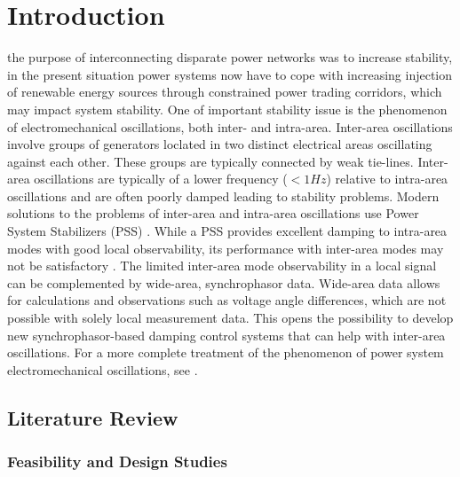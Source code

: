 \documentclass{ieeeaccess}
\begin{document}
\section{Introduction}
\label{sec:introduction}
 the purpose of interconnecting disparate power networks was to increase stability, in the present situation power systems now have to cope with increasing injection of renewable energy sources through constrained power trading corridors, which may impact system stability. One of important stability issue is the phenomenon of electromechanical oscillations\cite{KundurTwoArea}, both inter- and intra-area. Inter-area oscillations involve groups of generators loclated in two distinct electrical areas oscillating against each other. These groups are typically connected by weak tie-lines\cite{KundurTwoArea}. Inter-area oscillations are typically of a lower frequency ($<1 Hz$) relative to intra-area oscillations and are often poorly damped leading to stability problems\cite{KundurTwoArea}. Modern solutions to the problems of inter-area and intra-area oscillations use Power System Stabilizers (PSS) \cite{WAPODNorway}. While a PSS provides excellent damping to intra-area modes with good local observability, its performance with inter-area modes may not be satisfactory \cite{localREMcomparison}. The limited inter-area mode observability in a local signal can be complemented by wide-area, synchrophasor data. Wide-area data allows for calculations and observations such as voltage angle differences, which are not possible with solely local measurement data\cite{Yuwa}. This opens the possibility to develop new synchrophasor-based damping control systems that can help with inter-area oscillations. For a more complete treatment of the phenomenon of power system electromechanical oscillations, see \cite{Rogers_book}.


\subsection{Literature Review}

\subsubsection{Feasibility and Design Studies}
\end{document}
